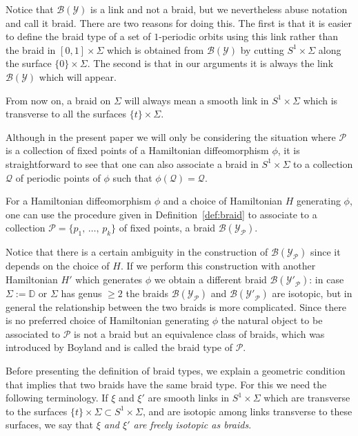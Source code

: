 \documentclass[AHL,Unicode,longabstracts,published]{cedram}
\newcommand{\D}{\mathbb{D}}
\newcommand{\clP}{\mathcal{P}}
\newcommand{\clY}{\mathcal{Y}}
\newcommand{\clB}{\mathcal{B}}
\newcommand{\clQ}{\mathcal{Q}}
\begin{document}
\begin{rema}
Notice that $\clB(\clY)$ is a link and not a braid, but we nevertheless abuse notation and call it braid. There are two reasons for doing this. The first is that it is easier to define the braid type of a set of $1$-periodic orbits using this link rather than the braid in $[0,1] \times \Sigma$ which is obtained from $\clB(\clY)$ by cutting $S^1 \times \Sigma$ along the surface $\{0\} \times \Sigma$. The second is that in our arguments it is always the link $\clB(\clY)$ which will appear.

From now on, a braid on $\Sigma$ will always mean a smooth link in $S^1 \times \Sigma$ which is transverse to all the surfaces $\{t\} \times \Sigma$.
\end{rema}

\begin{rema}
Although in the present paper we will only be considering the situation where $\clP$ is a collection of fixed points of a Hamiltonian diffeomorphism $\phi$, it is straightforward to see that one can also associate a braid in $S^1 \times \Sigma$ to a collection $\clQ$ of periodic points of $\phi$ such that $\phi(\clQ)= \clQ$.
\end{rema}



For a Hamiltonian diffeomorphism $\phi$ and a choice of Hamiltonian $H$ generating $\phi$, one can use the procedure given in Definition~\ref{def:braid} to associate to a collection $\clP=\{p_1,\,\ldots,\,p_k\}$ of fixed points, a braid $\clB({\clY}_{\clP})$.

Notice that there is a certain ambiguity in the construction of $\clB({\clY}_{\clP})$ since it depends on the choice of $H$. If we perform this construction with another Hamiltonian $H'$ which generates $\phi$ we obtain a different braid $\clB({\clY'}_{\clP})$: in case $\Sigma:= \D$ or $\Sigma$ has genus $\geq 2$ the braids $\clB({\clY}_{\clP})$ and $\clB({\clY'}_{\clP})$ are isotopic, but in general the relationship between the two braids is more complicated. Since there is no preferred choice of Hamiltonian generating $\phi$ the natural object to be associated to $\clP$ is not a braid but an equivalence class of braids, which was introduced by Boyland and is called the braid type of $\clP$.


Before presenting the definition of braid types, we explain a geometric condition that implies that two braids have the same braid type. For this we need the following terminology. If $\xi$ and $\xi'$ are smooth links in $ S^1 \times \Sigma$ which are transverse to the surfaces $\{t\} \times \Sigma \subset S^1 \times \Sigma$, and are isotopic among links transverse to these surfaces, we say that\emph{ $\xi$ and $\xi'$ are freely isotopic as braids}.
\end{document}
